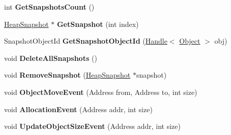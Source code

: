 \begin{DoxyCompactItemize}
\item 
int {\bfseries Get\+Snapshots\+Count} ()\hypertarget{classv8_1_1internal_1_1_heap_profiler_a674d9a5803aa04e8c5091289aae7d562}{}\label{classv8_1_1internal_1_1_heap_profiler_a674d9a5803aa04e8c5091289aae7d562}

\item 
\hyperlink{classv8_1_1internal_1_1_heap_snapshot}{Heap\+Snapshot} $\ast$ {\bfseries Get\+Snapshot} (int index)\hypertarget{classv8_1_1internal_1_1_heap_profiler_a6e1700f861f6260c7e2ecc53c6b7f53b}{}\label{classv8_1_1internal_1_1_heap_profiler_a6e1700f861f6260c7e2ecc53c6b7f53b}

\item 
Snapshot\+Object\+Id {\bfseries Get\+Snapshot\+Object\+Id} (\hyperlink{classv8_1_1internal_1_1_handle}{Handle}$<$ \hyperlink{classv8_1_1internal_1_1_object}{Object} $>$ obj)\hypertarget{classv8_1_1internal_1_1_heap_profiler_aec86d7e69472ced74bd92574696b4a0e}{}\label{classv8_1_1internal_1_1_heap_profiler_aec86d7e69472ced74bd92574696b4a0e}

\item 
void {\bfseries Delete\+All\+Snapshots} ()\hypertarget{classv8_1_1internal_1_1_heap_profiler_a95d369db8e294e4eb4d8e931d1eebf8e}{}\label{classv8_1_1internal_1_1_heap_profiler_a95d369db8e294e4eb4d8e931d1eebf8e}

\item 
void {\bfseries Remove\+Snapshot} (\hyperlink{classv8_1_1internal_1_1_heap_snapshot}{Heap\+Snapshot} $\ast$snapshot)\hypertarget{classv8_1_1internal_1_1_heap_profiler_abe0002601a7d13e03bf48713b7e2d3a0}{}\label{classv8_1_1internal_1_1_heap_profiler_abe0002601a7d13e03bf48713b7e2d3a0}

\item 
void {\bfseries Object\+Move\+Event} (Address from, Address to, int size)\hypertarget{classv8_1_1internal_1_1_heap_profiler_aef6308a35e96bc89e13295b9f08124f4}{}\label{classv8_1_1internal_1_1_heap_profiler_aef6308a35e96bc89e13295b9f08124f4}

\item 
void {\bfseries Allocation\+Event} (Address addr, int size)\hypertarget{classv8_1_1internal_1_1_heap_profiler_a5466f54a13dc18ab7e90d41fccd5ef2b}{}\label{classv8_1_1internal_1_1_heap_profiler_a5466f54a13dc18ab7e90d41fccd5ef2b}

\item 
void {\bfseries Update\+Object\+Size\+Event} (Address addr, int size)\hypertarget{classv8_1_1internal_1_1_heap_profiler_afbf0ad802eff44e4d4574a75f4aec2a5}{}\label{classv8_1_1internal_1_1_heap_profiler_afbf0ad802eff44e4d4574a75f4aec2a5}


\end{DoxyCompactItemize}
